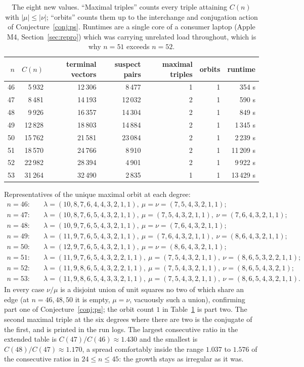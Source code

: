 \documentclass[11pt]{article}
\theoremstyle{remark}
\newcommand{\lam}{\lambda}
\begin{document}
\begin{table}[H]
\centering
\begin{tabular}{rrrrrrr}
\toprule
$n$ & $C(n)$ & terminal vectors & suspect pairs & maximal triples & orbits & runtime \\
\midrule
46 & 5\,932  & 12\,306 & 8\,477  & 1 & 1 & 354 s \\
47 & 8\,481  & 14\,193 & 12\,032 & 2 & 1 & 590 s \\
48 & 9\,926  & 16\,357 & 14\,304 & 2 & 1 & 849 s \\
49 & 12\,828 & 18\,803 & 14\,884 & 2 & 1 & 1\,345 s \\
50 & 15\,762 & 21\,581 & 23\,084 & 2 & 1 & 2\,239 s \\
51 & 18\,570 & 24\,766 & 8\,910  & 2 & 1 & 11\,209 s \\
52 & 22\,982 & 28\,394 & 4\,901  & 2 & 1 & 9\,922 s \\
53 & 31\,264 & 32\,490 & 2\,835  & 1 & 1 & 13\,429 s \\
\bottomrule
\end{tabular}
\caption{The eight new values. ``Maximal triples'' counts every triple attaining $C(n)$
with $|\mu|\le|\nu|$; ``orbits'' counts them up to the interchange and conjugation
action of Conjecture~\ref{conj:ps}. Runtimes are a single core of a consumer laptop
(Apple M4, Section~\ref{sec:repro}) which was carrying unrelated load throughout, which
is why $n=51$ exceeds $n=52$.}
\label{tab:results}
\end{table}

Representatives of the unique maximal orbit at each degree:
\begin{align*}
n=46:&\quad \lam=(10,8,7,6,4,4,3,2,1,1),\ \mu=\nu=(7,5,4,3,2,1,1);\\
n=47:&\quad \lam=(10,8,7,6,5,4,3,2,1,1),\ \mu=(7,5,4,3,2,1,1),\ \nu=(7,6,4,3,2,1,1);\\
n=48:&\quad \lam=(10,9,7,6,5,4,3,2,1,1),\ \mu=\nu=(7,6,4,3,2,1,1);\\
n=49:&\quad \lam=(11,9,7,6,5,4,3,2,1,1),\ \mu=(7,6,4,3,2,1,1),\ \nu=(8,6,4,3,2,1,1);\\
n=50:&\quad \lam=(12,9,7,6,5,4,3,2,1,1),\ \mu=\nu=(8,6,4,3,2,1,1);\\
n=51:&\quad \lam=(11,9,7,6,5,4,3,2,2,1,1),\ \mu=(7,5,4,3,2,1,1),\ \nu=(8,6,5,3,2,2,1,1);\\
n=52:&\quad \lam=(11,9,8,6,5,4,3,2,2,1,1),\ \mu=(7,5,4,3,2,1,1),\ \nu=(8,6,5,4,3,2,1);\\
n=53:&\quad \lam=(11,9,8,6,5,4,3,3,2,1,1),\ \mu=(7,5,4,3,2,1,1),\ \nu=(8,6,5,4,3,2,1,1).
\end{align*}
In every case $\nu/\mu$ is a disjoint union of unit squares no two of which share an edge
(at $n=46,48,50$ it is empty, $\mu=\nu$, vacuously such a union), confirming part one of
Conjecture~\ref{conj:ps}; the orbit count $1$ in Table~\ref{tab:results} is part two. The
second maximal triple at the six degrees where there are two is the conjugate of the
first, and is printed in the run logs. The largest consecutive ratio in the extended
table is $C(47)/C(46)\approx 1.430$ and the smallest is $C(48)/C(47)\approx 1.170$, a
spread comfortably inside the range $1.037$ to $1.576$ of the consecutive ratios in
$24\le n\le 45$: the growth stays as irregular as it was.
\end{document}
